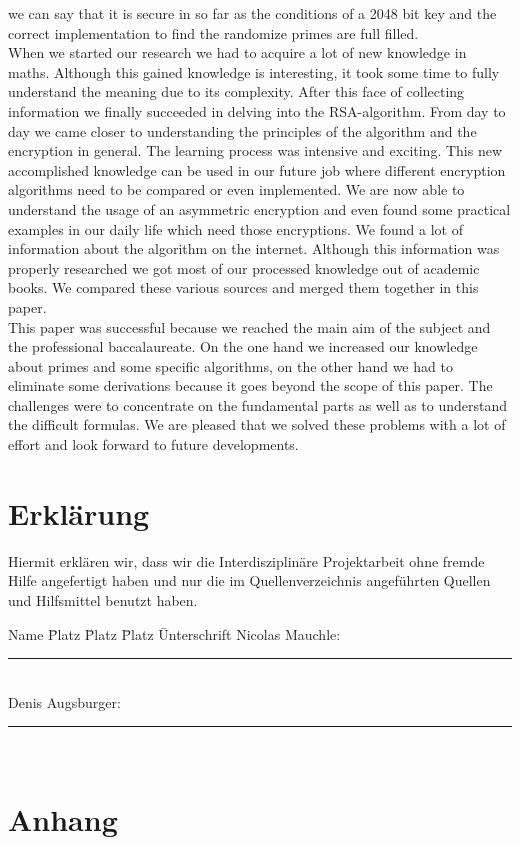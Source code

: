 we can say that it is secure in so far as the conditions of a 2048 bit key and the correct implementation to find the randomize primes are full filled. \\
When we started our research we had to acquire a lot of new knowledge in maths. Although this gained knowledge is interesting, it took some time to fully understand the meaning due to its complexity. After this face of collecting information we finally succeeded in delving into the RSA-algorithm. %
From day to day we came closer to understanding the principles of the algorithm and the encryption in general. The learning process was intensive and exciting. This new accomplished knowledge can be used in our future job where different encryption algorithms need to be compared or even implemented. We are now able to understand the usage of an asymmetric encryption and even found some practical examples in our daily life which need those encryptions.  
We found a lot of information about the algorithm on the internet. Although this information was properly researched we got most of our processed knowledge out of academic books. We compared these various sources and merged them together in this paper.\\
This paper was successful because we reached the main aim of the subject and the professional baccalaureate. On the one hand we increased our knowledge about primes and some specific algorithms, on the other hand we had to eliminate some derivations  %
because it goes beyond the scope of this paper. The challenges were to concentrate on the fundamental parts as well as to understand the difficult formulas. We are pleased that we solved these problems with a lot of effort and look forward to future developments. 
\newpage
\section{Erklärung}
Hiermit erklären wir, dass wir die Interdisziplinäre Projektarbeit ohne fremde Hilfe angefertigt haben und nur die im Quellenverzeichnis angeführten Quellen und Hilfsmittel benutzt haben.\\
  \begin{tabbing}
    Name \= Platz \= Platz \= Platz \=  Unterschrift \kill 
    Nicolas Mauchle:   \> \> \> \>   \rule{50mm}{1pt} \\[2ex]
    Denis Augsburger:   \> \> \> \>  \rule{50mm}{1pt} \\
  \end{tabbing}
\newpage
\section{Anhang}
\listoffigures
\listoftables
%

